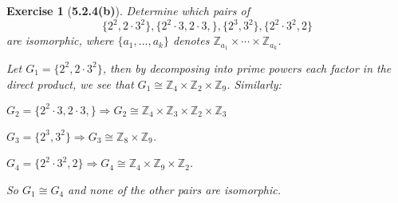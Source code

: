 \documentclass[10pt,oneside,reqno]{amsart}
\theoremstyle{plain}
\newtheorem*{e}{Exercise}
\theoremstyle{definition}
\begin{document}
\begin{comment}

So the possible invariant factor lists are: 
\begin{itemize}
\item $2 \cdot 3,2 \cdot 3,2,2,2,2$. 
\item $2 \cdot 3^2,2,2,2,2,2$.
\item $2^2 \cdot 3, 2 \cdot 3,2,2,2$. 
\item $2^2 \cdot 3, 2^2 \cdot 3,2,2$. 
\item $2^2 \cdot 3, 2^2 \cdot 3,2^2$. 
\item $2^2 \cdot 3^2, 2^2, 2^2$. 
\item $2^2 \cdot 3^2, 2^2,2,2$.
\item $2^2 \cdot 3^2, 2,2,2,2$. 
\item $2^3 \cdot 3^2, 2,2,2$. 
\item $2^3 \cdot 3, 2^3 \cdot 3$. 
\item $2^3 \cdot 3, 2^2 \cdot 3, 2$. 
\item $2^3 \cdot 3, 2 \cdot 3, 2, 2$. 
\item $2^3 \cdot 3^2, 2^3$. 
\item $2^3 \cdot 3^2, 2^2, 2$. 
\item $2^3 \cdot 3^2, 2,2, 2$. 
\item $2^4 \cdot 3^2, 2^2$. 
\item $2^4 \cdot 3^2, 2,2$. 
\item $2^4 \cdot 3, 2^2 \cdot 3$. 
\item $2^4 \cdot 3, 2 \cdot 3, 2$. 
\item $2^5 \cdot 3^2, 2$. 
\item $2^5 \cdot 3, 2 \cdot 3$.  
\item $2^6 \cdot 3^2$. 


\end{itemize}
So there are 22 different abelian groups of order 576. 

\end{comment}

\begin{e}[\textbf{5.2.4(b)}]
Determine which pairs of 
\[\{2^2, 2 \cdot 3^2\}, \{2^2 \cdot 3, 2 \cdot 3,\}, \{2^3, 3^2\}, \{2^2 \cdot 3^2, 2\}\]
are isomorphic, where $\{a_1,...,a_k\}$ denotes $\mathbb{Z}_{a_1} \times \cdots \times \mathbb{Z}_{a_k}$. 


Let $G_1 =\{2^2, 2 \cdot 3^2\}$, then by decomposing into prime powers each factor in the direct product, we see that $G_1 \cong \mathbb{Z}_4 \times  \mathbb{Z}_2 \times \mathbb{Z}_9$. Similarly: 

$G_2 =\{2^2 \cdot 3, 2 \cdot 3,\} \Rightarrow G_2 \cong \mathbb{Z}_4 \times \mathbb{Z}_3 \times \mathbb{Z}_2 \times \mathbb{Z}_3$

$G_3 =\{2^3, 3^2\} \Rightarrow G_3 \cong \mathbb{Z}_8 \times \mathbb{Z}_9$. 

$G_4 =\{2^2 \cdot 3^2, 2\} \Rightarrow G_4 \cong \mathbb{Z}_4 \times \mathbb{Z}_9 \times \mathbb{Z}_2$. 

So $G_1 \cong G_4$ and none of the other pairs are isomorphic. 



\end{e}
\end{document}
